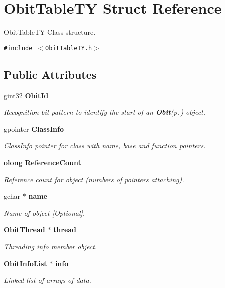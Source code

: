 \section{Obit\-Table\-TY Struct Reference}
\label{structObitTableTY}
Obit\-Table\-TY Class structure.  


{\tt \#include $<$Obit\-Table\-TY.h$>$}

\subsection*{Public Attributes}
\begin{CompactItemize}
\item 
gint32 {\bf Obit\-Id}
\begin{CompactList}\small\item\em Recognition bit pattern to identify the start of an {\bf Obit}{\rm (p.\,\pageref{structObit})} object. \item\end{CompactList}\item 
gpointer {\bf Class\-Info}
\begin{CompactList}\small\item\em Class\-Info pointer for class with name, base and function pointers. \item\end{CompactList}\item 
{\bf olong} {\bf Reference\-Count}
\begin{CompactList}\small\item\em Reference count for object (numbers of pointers attaching). \item\end{CompactList}\item 
gchar $\ast$ {\bf name}
\begin{CompactList}\small\item\em Name of object [Optional]. \item\end{CompactList}\item 
{\bf Obit\-Thread} $\ast$ {\bf thread}
\begin{CompactList}\small\item\em Threading info member object. \item\end{CompactList}\item 
{\bf Obit\-Info\-List} $\ast$ {\bf info}
\begin{CompactList}\small\item\em Linked list of arrays of data. \item\end{CompactList}\item 

\end{CompactItemize}
